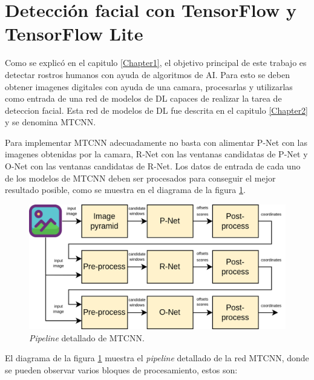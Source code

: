 \section{Detección facial con TensorFlow y TensorFlow Lite}
\label{section3_1}
Como se explicó en el capitulo \ref{Chapter1}, el objetivo principal de este trabajo es detectar rostros humanos con ayuda de algoritmos de AI. Para esto se deben obtener imagenes digitales con ayuda de una camara, procesarlas y utilizarlas como entrada de una red de modelos de DL capaces de realizar la tarea de deteccion facial. Esta red de modelos de DL fue descrita en el capitulo \ref{Chapter2} y se denomina MTCNN.

Para implementar MTCNN adecuadamente no basta con alimentar P-Net con las imagenes obtenidas por la camara, R-Net con las ventanas candidatas de P-Net y O-Net con las ventanas candidatas de R-Net. Los datos de entrada de cada uno de los modelos de MTCNN deben ser procesados para conseguir el mejor resultado posible, como se muestra en el diagrama de la figura \ref{fig:mtcnn_npipe}.

\begin{figure}[h]
	\centering
	\includegraphics[scale=0.3]{./Figures/mtcnn_npipe.png}
	\caption{\textit{Pipeline} detallado de MTCNN.}
	\label{fig:mtcnn_npipe}
\end{figure}

El diagrama de la figura \ref{fig:mtcnn_npipe} muestra el \textit{pipeline} detallado de la red MTCNN, donde se pueden observar varios bloques de procesamiento, estos son:

